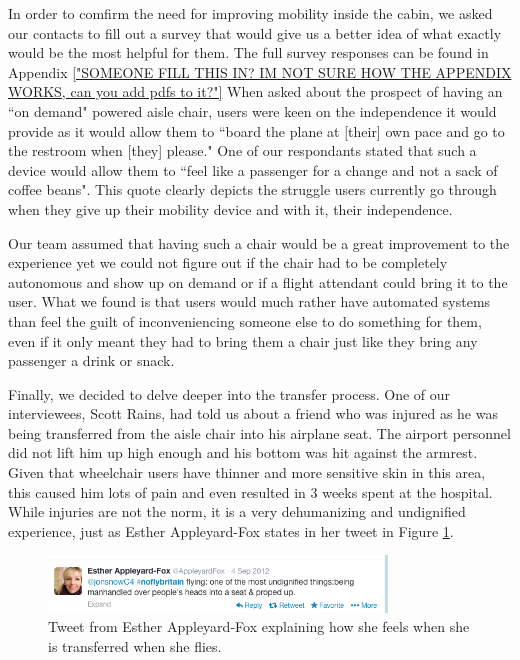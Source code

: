 In order to comfirm the need for improving mobility inside the cabin, we asked our contacts to fill out a survey that would give us a better idea of what exactly would be the most helpful for them. The full survey responses can be found in Appendix \ref{"SOMEONE FILL THIS IN? IM NOT SURE HOW THE APPENDIX WORKS, can you add pdfs to it?"} 
When asked about the prospect of having an ``on demand"  powered aisle chair, users were keen on the independence it would provide as it would allow them to ``board the plane at [their] own pace and go to the restroom when [they] please." One of our respondants stated that such a device would allow them to ``feel like a passenger for a change and not a sack of coffee beans". This quote clearly depicts the struggle users currently go through when they give up their mobility device and with it, their independence.

Our team assumed that having such a chair would be a great improvement to the experience yet we could not figure out if the chair had to be completely autonomous and show up on demand or if a flight attendant could bring it to the user. What we found is that users would much rather have automated systems than feel the guilt of inconveniencing someone else to do something for them, even if it only meant they had to bring them a chair just like they bring any passenger a drink or snack. 

Finally, we decided to delve deeper into the transfer process. One of our interviewees, Scott Rains, had told us about a friend who was injured as he was being transferred from the aisle chair into his airplane seat. The airport personnel did not lift him up high enough and his bottom was hit against the armrest. Given that wheelchair users have thinner and more sensitive skin in this area, this caused him lots of pain and even resulted in 3 weeks spent at the hospital. While injuries are not the norm, it is a very dehumanizing and undignified experience, just as Esther Appleyard-Fox states in her tweet in Figure \ref{fig:MobilityTweet.png}. 


\begin{figure}[h]
  \centering
     \includegraphics[width=9cm]{images/MobilityTweet.png}
   \caption{Tweet from Esther Appleyard-Fox explaining how she feels when she is transferred when she flies. }
  \label{fig:MobilityTweet.png}
\end{figure}


